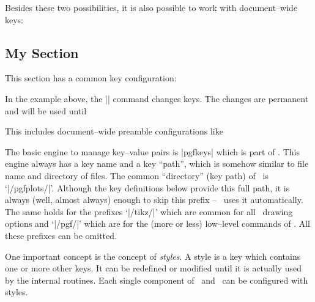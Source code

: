 Besides these two possibilities, it is also possible to work with document--wide keys:
\begin{codeexample}
\section{My Section}
\pgfplotsset{
	key=value,
	key2=value2,
}
This section has a common key configuration:
\end{codeexample}
\noindent In the example above, the |\pgfplotsset| command changes keys. The changes are permanent and will be used until 
\begin{itemize}
	\item you re--define them or
	\item the current environment (like |\end{figure}|) is ended or
	\item \TeX\ encounters a closing brace `|}|'.
\end{itemize}
This includes document--wide preamble configurations like

The basic engine to manage key--value pairs is |pgfkeys| which is part of \pgfname. This engine always has a key name and a key ``path'', which is somehow similar to file name and directory of files. The common ``directory'' (key path) of \PGFPlots\ is `|/pgfplots/|'. Although the key definitions below provide this full path, it is always (well, almost always) enough to skip this prefix -- \PGFPlots\ uses it automatically. The same holds for the prefixes `|/tikz/|' which are common for all \Tikz\ drawing options and `|/pgf/|' which are for the (more or less) low--level commands of \pgfname. All these prefixes can be omitted.

One important concept is the concept of \emph{styles}. A style is a key which contains one or more other keys. It can be redefined or modified until it is actually used by the internal routines. Each single component of \Tikz\ and \PGFPlots\ can be configured with styles.

